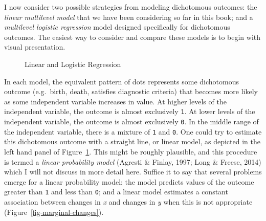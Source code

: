 \documentclass[
  letterpaper,
  DIV=11,
  numbers=noendperiod]{scrreprt}
\begin{document}
I now consider two possible strategies from modeling dichotomous
outcomes: the \emph{linear multilevel model} that we have been
considering so far in this book; and a \emph{multilevel logistic
regression} model designed specifically for dichotomous outcomes. The
easiest way to consider and compare these models is to begin with visual
presentation.

\begin{figure}


\caption{\label{fig-linear-logistic}Linear and Logistic Regression}

\end{figure}%

In each model, the equivalent pattern of dots represents some
dichotomous outcome (e.g.~birth, death, satisfies diagnostic criteria)
that becomes more likely as some independent variable increases in
value. At higher levels of the independent variable, the outcome is
almost exclusively \texttt{1}. At lower levels of the independent
variable, the outcome is almost exclusively \texttt{0}. In the middle
range of the independent variable, there is a mixture of \texttt{1} and
\texttt{0}. One could try to estimate this dichotomous outcome with a
straight line, or linear model, as depicted in the left hand panel of
Figure~\ref{fig-linear-logistic}. This might be roughly plausible, and
this procedure is termed a \emph{linear probability model} (Agresti \&
Finlay, 1997; Long \& Freese, 2014) which I will not discuss in more
detail here. Suffice it to say that several problems emerge for a linear
probability model: the model predicts values of the outcome greater than
\texttt{1} and less than \texttt{0}; and a linear model estimates a
constant association between changes in \emph{x} and changes in \emph{y}
when this is not appropriate (Figure~\ref{fig-marginal-changes}).
\end{document}
